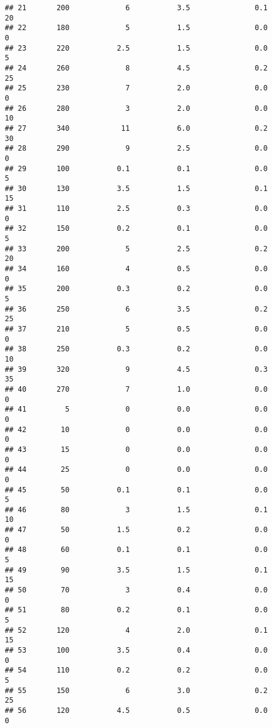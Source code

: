 \documentclass[
]{article}
\begin{document}
\begin{verbatim}
## 21       200             6           3.5               0.1          20
## 22       180             5           1.5               0.0           0
## 23       220           2.5           1.5               0.0           5
## 24       260             8           4.5               0.2          25
## 25       230             7           2.0               0.0           0
## 26       280             3           2.0               0.0          10
## 27       340            11           6.0               0.2          30
## 28       290             9           2.5               0.0           0
## 29       100           0.1           0.1               0.0           5
## 30       130           3.5           1.5               0.1          15
## 31       110           2.5           0.3               0.0           0
## 32       150           0.2           0.1               0.0           5
## 33       200             5           2.5               0.2          20
## 34       160             4           0.5               0.0           0
## 35       200           0.3           0.2               0.0           5
## 36       250             6           3.5               0.2          25
## 37       210             5           0.5               0.0           0
## 38       250           0.3           0.2               0.0          10
## 39       320             9           4.5               0.3          35
## 40       270             7           1.0               0.0           0
## 41         5             0           0.0               0.0           0
## 42        10             0           0.0               0.0           0
## 43        15             0           0.0               0.0           0
## 44        25             0           0.0               0.0           0
## 45        50           0.1           0.1               0.0           5
## 46        80             3           1.5               0.1          10
## 47        50           1.5           0.2               0.0           0
## 48        60           0.1           0.1               0.0           5
## 49        90           3.5           1.5               0.1          15
## 50        70             3           0.4               0.0           0
## 51        80           0.2           0.1               0.0           5
## 52       120             4           2.0               0.1          15
## 53       100           3.5           0.4               0.0           0
## 54       110           0.2           0.2               0.0           5
## 55       150             6           3.0               0.2          25
## 56       120           4.5           0.5               0.0           0

\end{verbatim}
\end{document}
